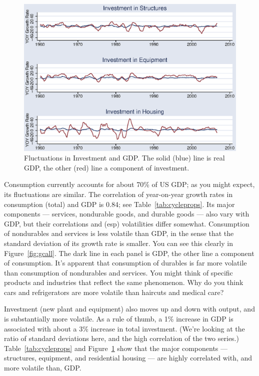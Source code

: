 \documentclass[letterpaper,12pt]{article}
\begin{document}
\begin{figure}[h]
    \centering
    \includegraphics[scale=0.8]{usgiall.eps}
    \caption{Fluctuations in Investment and GDP.
    The solid (blue) line is real GDP, the other (red) line
    a component of investment.}
    \label{fig:giall}%
\end{figure}


Consumption currently accounts for about 70\% of US GDP;  
as you might expect, its fluctuations are similar.
The correlation of year-on-year growth rates in consumption (total) 
and GDP is 0.84; see Table~\ref{tab:cycleprops}.
Its major components --- services, nondurable goods, 
and durable goods --- also vary with GDP, 
but their correlations and (esp) volatilities differ somewhat.
Consumption of nondurables and services 
is less volatile than GDP, in the sense that 
the standard deviation of its growth rate is smaller.
You can see this clearly in Figure~\ref{fig:gcall}.
The dark line in each panel is GDP, 
the other line a component of consumption.
It's apparent that consumption of durables is far more
volatile than consumption of nondurables and services.
You might think of specific products and industries that reflect
the same phenomenon.
Why do you think cars and refrigerators 
are more volatile than haircuts and medical care?  


Investment (new plant and equipment) also moves up and down with output, 
and is substantially more volatile.  
As a rule of thumb, a 1\% increase in GDP is associated with 
about a 3\% increase in total investment.  
(We're looking at the ratio of standard deviations here, 
and the high correlation of the two series.) 
Table~\ref{tab:cycleprops} and Figure~\ref{fig:giall} 
show that the major components --- structures, equipment, 
and residential housing --- are highly correlated with, 
and more volatile than, GDP.  
\end{document}
